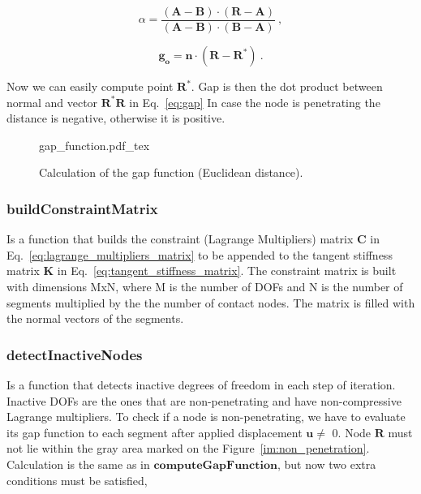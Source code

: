 \documentclass[10pt,a4paper]{article}
\begin{document}
\begin{equation}
	\alpha = \frac{(\mathbf{A}-\mathbf{B})\cdot(\mathbf{R}-\mathbf{A})}{(\mathbf{A}-\mathbf{B})\cdot(\mathbf{B}-\mathbf{A})}  \:,
	\label{eq:parameter_alpha}
\end{equation}

\begin{equation}
	\mathbf{g_o} = \mathbf{n}\cdot(\mathbf{R}-\mathbf{R}^*)  \:.
	\label{eq:gap}
\end{equation}

Now we can easily compute point $\mathbf{R}^*$. Gap is then the dot product between normal and vector $\mathbf{R}^*\mathbf{R}$ in Eq.~\eqref{eq:gap} In case the node is penetrating the distance is negative, otherwise it is positive.

\begin{figure}[ht]
	\centering
	\footnotesize
    \def\svgwidth{0.85\textwidth}{gap_function.pdf_tex}
	\caption{Calculation of the gap function (Euclidean distance).}
	\label{im:gap_function}
\end{figure}

\subsubsection{buildConstraintMatrix}

Is a function that builds the constraint (Lagrange Multipliers) matrix $\mathbf{C}$ in Eq.~\eqref{eq:lagrange_multipliers_matrix} to be appended to the tangent stiffness matrix $\mathbf{K}$ in Eq.~\eqref{eq:tangent_stiffness_matrix}. The constraint matrix is built with dimensions MxN, where M is the number of DOFs and N is the number of segments multiplied by the the number of contact nodes. The matrix is filled with the normal vectors of the segments.

\subsubsection{detectInactiveNodes}

Is a function that detects inactive degrees of freedom in each step of iteration. Inactive DOFs are the ones that are non-penetrating and have non-compressive Lagrange multipliers. To check if a node is non-penetrating, we have to evaluate its gap function to each segment after applied displacement $\mathbf{u \ne}$ 0. Node $\mathbf{R}$ must not lie within the gray area marked on the Figure~\ref{im:non_penetration}. Calculation is the same as in $\textbf{computeGapFunction}$, but now two extra conditions must be satisfied,
\end{document}
